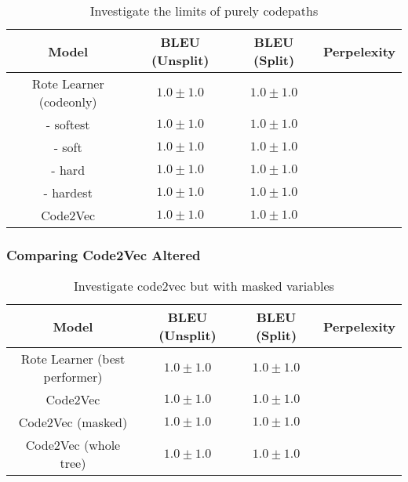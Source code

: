 \begin{table}[h!]
\begin{center}
\begin{tabular}{ c | c | c | c }
    Model                             & BLEU (Unsplit)  & BLEU (Split)    & Perpelexity \\
    \hline
    Rote Learner (codeonly)           & $1.0 \pm 1.0 $  & $1.0 \pm 1.0 $  & \\
    - softest                         & $1.0 \pm 1.0 $  & $1.0 \pm 1.0 $  & \\
    - soft                            & $1.0 \pm 1.0 $  & $1.0 \pm 1.0 $  & \\
    - hard                            & $1.0 \pm 1.0 $  & $1.0 \pm 1.0 $  & \\
    - hardest                         & $1.0 \pm 1.0 $  & $1.0 \pm 1.0 $  & \\
    \hline
    Code2Vec                          & $1.0 \pm 1.0 $  & $1.0 \pm 1.0 $  &  \\
    \hline
\end{tabular}
\caption {Investigate the limits of purely codepaths}
\label{table:name_code2vec_solo}
\end{center}
\end{table}


\subsubsection{Comparing Code2Vec Altered} %
\label{ssub:comparing_code2vec_altered}


\begin{table}[h!]
\begin{center}
\begin{tabular}{ c | c | c | c }
    Model                             & BLEU (Unsplit)  & BLEU (Split)    & Perpelexity \\
    \hline
    Rote Learner (best performer)           & $1.0 \pm 1.0 $  & $1.0 \pm 1.0 $  & \\
    \hline
    Code2Vec                             & $1.0 \pm 1.0 $  & $1.0 \pm 1.0 $  &  \\
    Code2Vec (masked)                    & $1.0 \pm 1.0 $  & $1.0 \pm 1.0 $  &  \\
    Code2Vec (whole tree)                & $1.0 \pm 1.0 $  & $1.0 \pm 1.0 $  &  \\
    \hline
\end{tabular}
\caption {Investigate code2vec but with masked variables}
\label{table:code_2_vec_masked}
\end{center}
\end{table}


